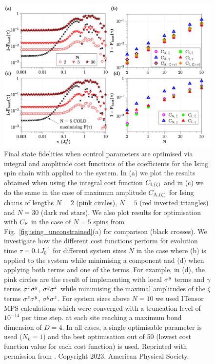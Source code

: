 \begin{figure}[t!]
    \centering
    \includegraphics[width=\linewidth]{images/ising_max_int_plots.png} \caption[Plot of final state fidelity for the Ising spin chain for different cost functions with LCD applied.]{Final state fidelities when control parameters are optimised via integral and amplitude cost functions of the   coefficients for the Ising spin chain with   applied to the system. In (a) we plot the results obtained when using the integral cost function $C_{\rm I, (\zeta)}$ and in (c) we do the same in the case of maximum amplitude $C_{\rm A, (\zeta)}$ for Ising chains of lengths $N = 2$ (pink circles), $N = 5$ (red inverted triangles) and $N=30$ (dark red stars). We also plot results for  optimisation with $C_{\rm F}$ in the case of $N=5$ spins from Fig.~\ref{fig:ising_unconstrained}(a) for comparison (black crosses). We investigate how the different cost functions perform for evolution time $\tau = 0.1J_0^{-1}$ for different system sizes $N$ in the case where (b)   is applied to the system while minimising a  component and (d) when applying both  terms and one of the  terms. For example, in (d), the pink circles are the result of implementing  with  local $\sigma^y$ terms and $\gamma$ terms $\sigma^x\sigma^y$, $\sigma^y\sigma^x$ while minimising the maximal amplitudes of the $\zeta$ terms $\sigma^z\sigma^y$, $\sigma^y\sigma^z$. For system sizes above $N=10$ we used ITensor\cite{fishman_itensor_2022} MPS calculations which were converged with a truncation level of $10^{-14}$ per time step. at each site reaching a maximum bond dimension of $D = 4$. In all cases, a single optimisable parameter is used ($N_k = 1$) and the best optimisation out of 50 (lowest cost function value for each cost function) is used. Reprinted with permission from \cite{cepaite_counterdiabatic_2023}. Copyright 2023, American Physical Society.}\label{fig:ising_minimising_ho_mainplot}
\end{figure}

